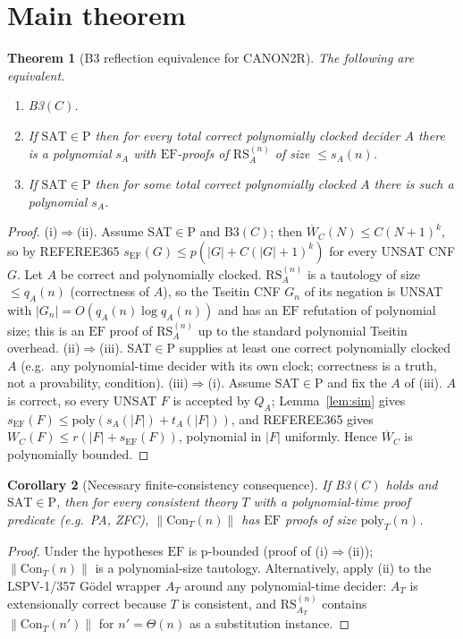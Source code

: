 \documentclass[11pt]{article}
\newtheorem{theorem}{Theorem}
\newtheorem{corollary}[theorem]{Corollary}
\newcommand{\EF}{\mathrm{EF}}
\newcommand{\RS}{\mathrm{RS}}
\begin{document}
\section{Main theorem}
\begin{theorem}[B3 reflection equivalence for CANON2R]\label{thm:main}
The following are equivalent.
\begin{enumerate}
\item[(i)] B3$(C)$.
\item[(ii)] If $\mathrm{SAT}\in\mathrm P$ then for \emph{every} total correct polynomially clocked
decider $A$ there is a polynomial $s_A$ with $\EF$-proofs of $\RS_A^{(n)}$ of size $\le s_A(n)$.
\item[(iii)] If $\mathrm{SAT}\in\mathrm P$ then for \emph{some} total correct polynomially clocked $A$
there is such a polynomial $s_A$.
\end{enumerate}
\end{theorem}
\begin{proof}
(i)$\Rightarrow$(ii). Assume SAT$\in$P and B3$(C)$; then $\overline W_C(N)\le C(N+1)^k$, so by
REFEREE365 $s_\EF(G)\le p(|G|+C(|G|+1)^k)$ for every UNSAT CNF $G$. Let $A$ be correct and
polynomially clocked. $\RS_A^{(n)}$ is a tautology of size $\le q_A(n)$ (correctness of $A$),
so the Tseitin CNF $G_n$ of its negation is UNSAT with $|G_n|=O(q_A(n)\log q_A(n))$ and has an
$\EF$ refutation of polynomial size; this is an $\EF$ proof of $\RS_A^{(n)}$ up to the standard
polynomial Tseitin overhead.
(ii)$\Rightarrow$(iii). SAT$\in$P supplies at least one correct polynomially clocked $A$
(e.g.\ any polynomial-time decider with its own clock; correctness is a truth, not a provability, condition).
(iii)$\Rightarrow$(i). Assume SAT$\in$P and fix the $A$ of (iii). $A$ is correct, so every UNSAT $F$ is
accepted by $Q_A$; Lemma~\ref{lem:sim} gives $s_\EF(F)\le\mathrm{poly}(s_A(|F|)+t_A(|F|))$, and REFEREE365
gives $W_C(F)\le r(|F|+s_\EF(F))$, polynomial in $|F|$ uniformly. Hence $\overline W_C$ is polynomially bounded.
\end{proof}

\begin{corollary}[Necessary finite-consistency consequence]\label{cor:con}
If B3$(C)$ holds and $\mathrm{SAT}\in\mathrm P$, then for every consistent theory $T$ with a
polynomial-time proof predicate (e.g.\ PA, ZFC), $\|\mathrm{Con}_T(n)\|$ has $\EF$ proofs of size $\mathrm{poly}_T(n)$.
\end{corollary}
\begin{proof}
Under the hypotheses $\EF$ is p-bounded (proof of (i)$\Rightarrow$(ii)); $\|\mathrm{Con}_T(n)\|$ is a
polynomial-size tautology. Alternatively, apply (ii) to the LSPV-1/357 G\"odel wrapper $A_T$ around any
polynomial-time decider: $A_T$ is extensionally correct because $T$ is consistent, and $\RS_{A_T}^{(n)}$
contains $\|\mathrm{Con}_T(n')\|$ for $n'=\Theta(n)$ as a substitution instance.
\end{proof}
\end{document}
